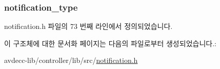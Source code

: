 \subsubsection[{\texorpdfstring{notification\+\_\+type}{notification_type}}]{ notification\+\_\+type}\hypertarget{structavdecc__lib_1_1notification_1_1notification__data_afd27fd1b2a0f1fb47cab9d187d542155}{}\label{structavdecc__lib_1_1notification_1_1notification__data_afd27fd1b2a0f1fb47cab9d187d542155}


notification.\+h 파일의 73 번째 라인에서 정의되었습니다.



이 구조체에 대한 문서화 페이지는 다음의 파일로부터 생성되었습니다.\+:\begin{DoxyCompactItemize}
\item 
avdecc-\/lib/controller/lib/src/\hyperlink{notification_8h}{notification.\+h}\end{DoxyCompactItemize}
